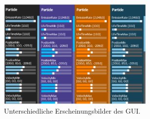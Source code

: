 \begin{Spacing}{\mylinespace}
\begin{figure}[h!]
	\centering
	\vspace*{10px}
	\includegraphics[width=290px]{graphics/guiThemes.png}
	\caption{Unterschiedliche Erscheinungsbilder des GUI.}
	\label{fig:GUIThemes}
\end{figure}

\end{Spacing}
\newpage

\clearpage
